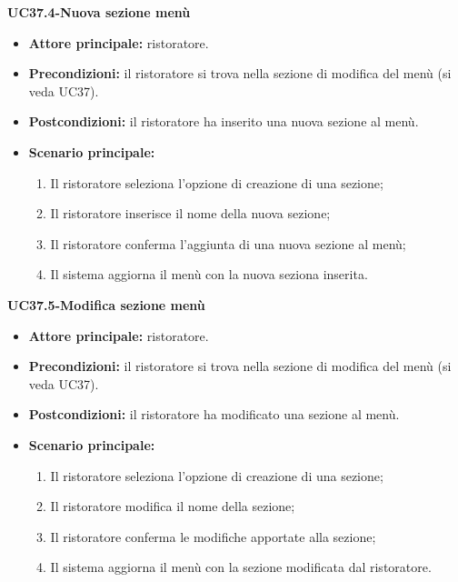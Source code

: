 \textbf{UC37.4-Nuova sezione menù}  
\begin{itemize}
    \item \textbf{Attore principale:} ristoratore.
    \item \textbf{Precondizioni:} il ristoratore si trova nella sezione di modifica del menù (si veda UC37).
    \item \textbf{Postcondizioni:} il ristoratore ha inserito una nuova sezione al menù.
    \item \textbf{Scenario principale:}
    \begin{enumerate}
        \item Il ristoratore seleziona l'opzione di creazione di una sezione;
        \item Il ristoratore inserisce il nome della nuova sezione;
        \item Il ristoratore conferma l'aggiunta di una nuova sezione al menù;
        \item Il sistema aggiorna il menù con la nuova seziona inserita.
    \end{enumerate}
\end{itemize}

\textbf{UC37.5-Modifica sezione menù}  
\begin{itemize}
    \item \textbf{Attore principale:} ristoratore.
    \item \textbf{Precondizioni:} il ristoratore si trova nella sezione di modifica del menù (si veda UC37).
    \item \textbf{Postcondizioni:} il ristoratore ha modificato una sezione al menù.
    \item \textbf{Scenario principale:}
    \begin{enumerate}
        \item Il ristoratore seleziona l'opzione di creazione di una sezione;
        \item Il ristoratore modifica il nome della sezione;
        \item Il ristoratore conferma le modifiche apportate alla sezione;
        \item Il sistema aggiorna il menù con la sezione modificata dal ristoratore.
    \end{enumerate}
\end{itemize}


